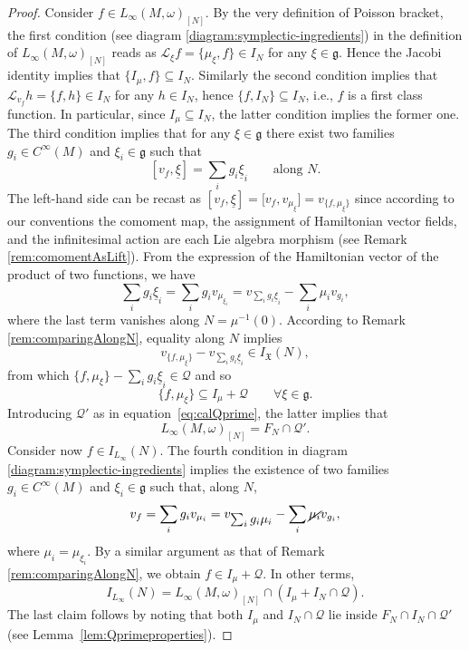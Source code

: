 \documentclass[pdftex]{sigma}
\numberwithin{equation}{section}
\newcommand{\g}{\mathfrak{g}}
\renewcommand{\L}{\mathscr{L}}
\renewcommand{\subset}{\subseteq}
\begin{document}
\begin{proof}
	Consider $f\in L_\infty(M,\omega)_{[N]}$.
	By the very definition of Poisson bracket, the first condition (see diagram \eqref{diagram:symplectic-ingredients}) in the definition of $L_\infty(M,\omega)_{[N]}$ reads as $\L_\xi f = \{\mu_\xi,f\} \in I_N$ for any $\xi \in \mathfrak{g}$.
	Hence the Jacobi identity implies that $\lbrace I_\mu, f\rbrace \subset I_N$.
	Similarly the second condition implies that $\L_{v_f} h = \lbrace f,h \rbrace \in I_N$ for any $h\in I_N$, hence $\{f,I_N\}\subset I_N$, i.e., $f$ is a first class function. In particular, since $I_\mu\subset I_N$, the latter condition implies the former one.
	The third condition implies that for any $\xi \in \g$ there exist two families $g_i \in C^\infty(M)$ and $\xi_i \in \g$ such that
	\[
		[v_f,\underline{\xi}] = \sum_i g_i \underline{\xi}_i \qquad \text{along $N$.}
	\]
	The left-hand side can be recast as
	$[v_f,\underline{\xi}] = \bigl[v_f,v_{\mu_\xi}\bigr] = v_{\{f,\mu_\xi\}}$ since according to our conventions the comoment map, the assignment of Hamiltonian vector fields, and the infinitesimal action are each Lie algebra morphism (see Remark \ref{rem:comomentAsLift}).
	From the expression of the Hamiltonian vector of the product of two functions, we have
	\[
		\sum_i g_i\underline{\xi}_i =
		\sum_i g_i v_{\mu_{\xi_i}} =
		v_{\sum_i g_i \underline{\xi}_i} - \sum_i \mu_i v_{g_i}  ,
	\]
	where the last term vanishes along $N=\mu^{-1}(0)$.
	According to Remark \ref{rem:comparingAlongN}, equality along $N$ implies
	\[
		v_{\{f,\mu_\xi\}} - v_{\sum_i g_i \underline{\xi}_i} \in I_{\mathfrak{X}}(N),
	\]
	from which $\{f,\mu_\xi\} - \sum_i g_i \underline{\xi}_i \in \mathcal{Q}$ and so
	\[
		\{f,\mu_\xi\} \subset I_\mu + \mathcal{Q} \qquad \forall \xi \in \g.
	\]
	Introducing $\mathcal{Q}'$ as in equation~\eqref{eq:calQprime}, the latter implies that
	\[
		L_\infty(M,\omega)_{[N]} = F_N \cap \mathcal{Q'}.
	\]
	Consider now $f \in I_{L_\infty}(N)$. The fourth condition in diagram \eqref{diagram:symplectic-ingredients} implies the existence of two families $g_i \in C^\infty(M)$ and $\xi_i \in \g$ such that, along $N$,
	\[
		v_f = \sum_i g_i  v_{\mu_i} =
		v_{\textstyle\sum_i g_i\mu_i} - \sum_i \cancel{\mu_i}v_{g_i} ,
	\]
	where $\mu_i = \mu_{\xi_i}$.
	By a similar argument as that of Remark \ref{rem:comparingAlongN}, we obtain $f\in I_\mu + \mathcal{Q}$.
	In other terms,
	\[
		I_{L_\infty}(N)=L_\infty(M,\omega)_{[N]} \cap (I_\mu+ I_N \cap\mathcal{Q}).
	\]
	The last claim follows by noting that both $I_\mu$ and $I_N\cap\mathcal{Q}$ lie inside $F_N\cap I_N \cap \mathcal{Q}'$ (see Lem\-ma~\ref{lem:Qprimeproperties}).
\end{proof}
\end{document}
